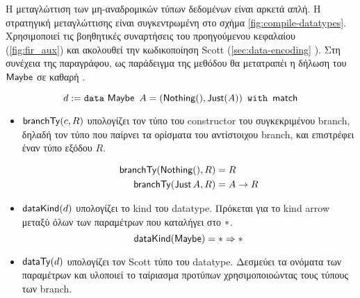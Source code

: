
Η μεταγλώττιση των μη-αναδρομικών τύπων δεδομένων είναι αρκετά απλή. 
Η στρατηγική μεταγλώττισης είναι συγκεντρωμένη στο σχήμα \ref{fig:compile-datatypes}.
Χρησιμοποιεί τις βοηθητικές συναρτήσεις του προηγούμενου κεφαλαίου (\ref{fig:fir_aux}) και ακολουθεί
την κωδικοποίηση Scott (\ref{sec:data-encoding} ). Στη συνέχεια της παραγράφου, ως παράδειγμα της μεθόδου θα μετατραπέι η \FIR{} δήλωση του $\operatorname{\textsf{Maybe}}$
σε καθαρή \FOMF{}.


\begin{displaymath}
d := \operatorname{\texttt{data}}{} \operatorname{\textsf{Maybe}} ~ A = (\operatorname{\textsf{Nothing}} (), \operatorname{\textsf{Just}} (A)) ~ \operatorname{\texttt{with}} ~ \operatorname{\textsf{match}}
\end{displaymath}
\begin{itemize}
\item $\mathsf{branchTy}(c, R)$ υπολογίζει τον τύπο του constructor του συγκεκριμένου branch, δηλαδή τον
τύπο που παίρνει τα ορίσματα του αντίστοιχου branch, και επιστρέφει έναν τύπο εξόδου $R$. 

  \begin{align*}
  \mathsf{branchTy}(\operatorname{\textsf{Nothing}} (), R) &= R\\
  \mathsf{branchTy}(\operatorname{\textsf{Just}} A, R) &= A \rightarrow R
  \end{align*}
  
\item $\mathsf{dataKind}(d)$ υπολογίζει το kind του datatype. Πρόκεται για το kind arrow μεταξύ όλων των
παραμέτρων που καταλήγει στο $\operatorname{\ast}$.
  $$\mathsf{dataKind}(\operatorname{\textsf{Maybe}}) = \operatorname{\ast} \Rightarrow \operatorname{\ast}$$
\item $\mathsf{dataTy}(d)$ υπολογίζει τον Scott τύπο του datatype. Δεσμεύει τα ονόματα των παραμέτρων
και υλοποιεί το ταίριασμα προτύπων χρησιμοποιοώντας τους τύπους των branch.


\end{itemize}
